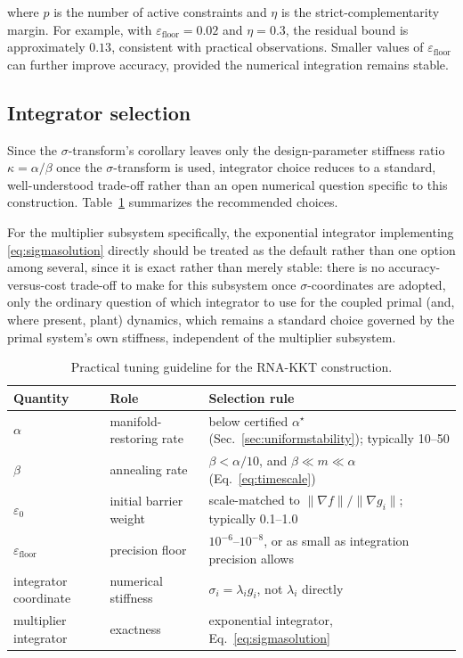 \documentclass[11pt,onecolumn]{article}
\theoremstyle{definition}
\theoremstyle{remark}
\begin{document}
where $p$ is the number of active constraints and $\eta$ is the strict-complementarity margin. For example, with $\varepsilon_{\text{floor}}=0.02$ and $\eta=0.3$, the residual bound is approximately $0.13$, consistent with practical observations. Smaller values of $\varepsilon_{\text{floor}}$ can further improve accuracy, provided the numerical integration remains stable.



\subsection{Integrator selection}
Since the $\sigma$-transform's corollary leaves only the design-parameter stiffness ratio
$\kappa = \alpha/\beta$ once the $\sigma$-transform is used, integrator choice reduces to a
standard, well-understood trade-off rather than an open numerical question specific to this
construction. Table~\ref{tab:tuning} summarizes the recommended choices.

For the multiplier subsystem specifically, the exponential integrator implementing
\eqref{eq:sigmasolution} directly should be treated as the default rather than one option among
several, since it is exact rather than merely stable: there is no accuracy-versus-cost trade-off
to make for this subsystem once $\sigma$-coordinates are adopted, only the ordinary question of
which integrator to use for the coupled primal (and, where present, plant) dynamics, which
remains a standard choice governed by the primal system's own stiffness, independent of the
multiplier subsystem.

\begin{table}[H]
\centering






\caption{Practical tuning guideline for the RNA-KKT construction.}
\label{tab:tuning}
\begin{tabularx}{\textwidth}{@{}llX@{}}
\toprule
Quantity & Role & Selection rule \\
\midrule
$\alpha$ & manifold-restoring rate & below certified $\alpha^\star$ (Sec.~\ref{sec:uniformstability}); typically 10--50 \\
$\beta$ & annealing rate & $\beta < \alpha/10$, and $\beta \ll m \ll \alpha$ (Eq.~\eqref{eq:timescale}) \\
$\varepsilon_0$ & initial barrier weight & scale-matched to $\|\nabla f\|/\|\nabla g_i\|$; typically 0.1--1.0 \\
$\varepsilon_{\mathrm{floor}}$ & precision floor & $10^{-6}$--$10^{-8}$, or as small as integration precision allows \\
integrator coordinate & numerical stiffness & $\sigma_i = \lambda_i g_i$, not $\lambda_i$ directly \\
multiplier integrator & exactness & exponential integrator, Eq.~\eqref{eq:sigmasolution} \\
\bottomrule
\end{tabularx}
\end{table}
\end{document}
